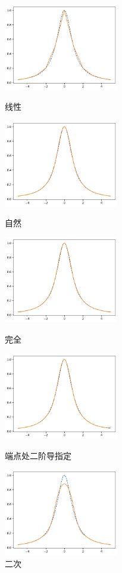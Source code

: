 \documentclass{ctexart}
\begin{document}
\begin{figure}[htbp]
\centering
\begin{minipage}{5cm}
    \centering
    \includegraphics[width=5cm]{c1.png}
    \caption{线性}
    \label{c1}
\end{minipage}
\qquad
\begin{minipage}{5cm}
    \centering
    \includegraphics[width=5cm]{c3.png}
    \caption{自然}
    \label{c2}
\end{minipage}
\begin{minipage}{5cm}
    \centering
    \includegraphics[width=5cm]{c2.png}
    \caption{完全}
    \label{c3}
\end{minipage}
\qquad
\begin{minipage}{5cm}
    \centering
    \includegraphics[width=5cm]{c4.png}
    \caption{端点处二阶导指定}
    \label{c4}
\end{minipage}
\begin{minipage}{5cm}
    \centering
    \includegraphics[width=5cm]{c5.png}
    \caption{二次}
    \label{c5}
\end{minipage}
\end{figure}
\end{document}
